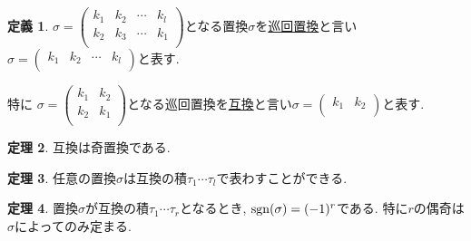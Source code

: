 \documentclass[dvipdfmx,a4paper,11pt]{article} %
\newcommand{\sgn}{{\rm sgn}}
\theoremstyle{definition}
\newtheorem{thm}{定理}
\newtheorem{dfn}[thm]{定義}
\begin{document}
    \begin{dfn}\cite[問題 3.1]{O}
 $ \sigma =
  \begin{pmatrix}
 k_1& k_2  &\cdots &k_l\\
 k_2& k_3  &\cdots &k_1\\
 \end{pmatrix} 
$となる置換$\sigma$を\underline{巡回置換}と言い
$\sigma =
  \begin{pmatrix}
 k_1& k_2  &\cdots &k_l\\
 \end{pmatrix} 
$と表す.

特に $ \sigma =
  \begin{pmatrix}
 k_1& k_2  \\
 k_2& k_1 \\
 \end{pmatrix} 
$となる巡回置換を\underline{互換}と言い$\sigma =
  \begin{pmatrix}
 k_1& k_2 \\
 \end{pmatrix} 
$と表す.
  \end{dfn}

    \begin{thm}\cite[定理 3.1.9]{O}
    互換は奇置換である. 
 \end{thm}
 
     \begin{thm}\cite[定理 3.1.10]{O}
任意の置換$\sigma$は互換の積$\tau_1 \cdots \tau_{l}$で表わすことができる.
  \end{thm}


    \begin{thm}\cite[定理 3.1.11]{O}
置換$\sigma$が互換の積$\tau_1 \cdots \tau_{r}$となるとき, 
$\sgn (\sigma) = (-1)^{r}$である. 特に$r$の偶奇は$\sigma$によってのみ定まる.
 \end{thm}
 
\end{document}
